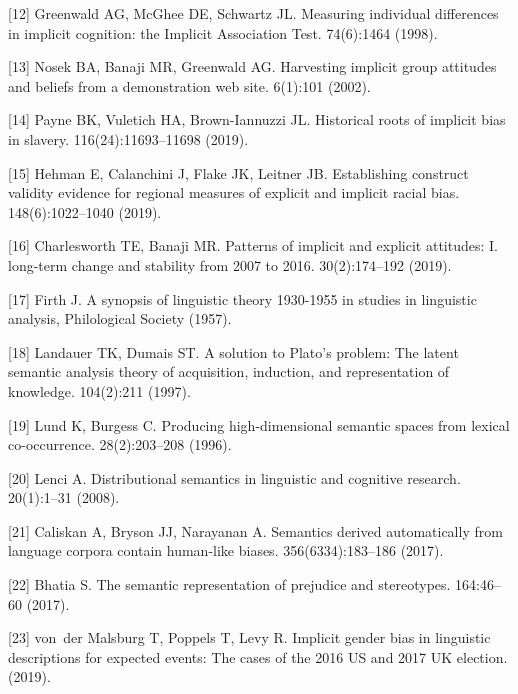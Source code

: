 \documentclass[9pt,twocolumn]{pnas-new}
\begin{document}
[12] Greenwald AG, McGhee DE, Schwartz JL.  Measuring individual differences in
  implicit cognition: the {I}mplicit {A}ssociation {T}est.
 74(6):1464  (1998).

[13] Nosek BA, Banaji MR, Greenwald AG. Harvesting implicit group attitudes
  and beliefs from a demonstration web site.
 6(1):101  (2002).

[14] Payne BK, Vuletich HA, Brown-Iannuzzi JL. Historical roots of implicit
  bias in slavery.
  116(24):11693--11698  (2019).

[15] Hehman E, Calanchini J, Flake JK, Leitner JB. Establishing construct
  validity evidence for regional measures of explicit and implicit racial bias.
 148(6):1022--1040  (2019).

[16]  Charlesworth TE, Banaji MR. Patterns of implicit and explicit attitudes:
  I. long-term change and stability from 2007 to 2016.
 30(2):174--192 (2019).

[17] Firth J. A synopsis of linguistic theory 1930-1955 in studies in
  linguistic analysis, {P}hilological {S}ociety (1957).

[18] Landauer TK, Dumais ST. A solution to {P}lato's problem: The latent
  semantic analysis theory of acquisition, induction, and representation of
  knowledge.
 104(2):211 (1997).

[19] Lund K, Burgess C. Producing high-dimensional semantic spaces from
  lexical co-occurrence.
  28(2):203--208  (1996).

[20] Lenci A. Distributional semantics in linguistic and cognitive research.
 20(1):1--31  (2008).

[21] Caliskan A, Bryson JJ, Narayanan A. Semantics derived automatically from
  language corpora contain human-like biases.
 356(6334):183--186 (2017).

[22] Bhatia S. The semantic representation of prejudice and stereotypes.
 164:46--60 (2017).

[23] von~der Malsburg T, Poppels T, Levy R. Implicit gender bias in linguistic
  descriptions for expected events: The cases of the 2016 {US} and 2017 {UK}
  election.
 (2019).
\end{document}

